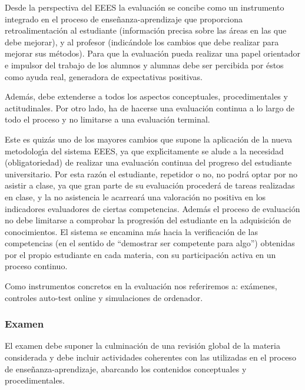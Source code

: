 Desde la perspectiva del EEES la evaluaci\'{o}n se concibe como un 
{  instrumento integrado} en el proceso de  ense\~{n}anza-aprendizaje
que {  proporciona  retroalimentaci\'{o}n} al estudiante
(informaci\'{o}n precisa sobre las \'{a}reas en las que debe mejorar),
y al profesor (indic\'{a}ndole los cambios que debe realizar 
para mejorar sus m\'{e}todos).
Para que la evaluaci\'{o}n pueda realizar una papel orientador e impulsor
del trabajo de los alumnos  y alumnas debe ser percibida por \'{e}stos como ayuda real,
generadora de {  expectativas positivas}.

Adem\'{a}s, debe extenderse a todos los aspectos {conceptuales},
{procedimentales} y {actitudinales}. Por otro lado, 
ha de  hacerse una evaluaci\'{o}n continua
 a lo largo de {  todo el proceso} y no limitarse a una
evaluaci\'{o}n terminal.



Este es quiz\'{a}s uno de los mayores cambios  que  supone la 
aplicaci\'{o}n de la nueva metodolog\'{\i}a del sistema EEES,
 ya que expl\'{\i}citamente se
alude a la necesidad (obligatoriedad)
 de realizar una {evaluaci\'{o}n continua} del
progreso del estudiante universitario.
Por esta raz\'{o}n el estudiante, repetidor o no,  no podr\'{a} optar
por no asistir a clase, ya que gran parte de su evaluaci\'{o}n proceder\'{a}
de tareas realizadas en clase, y la no asistencia
le acarrear\'{a} una valoraci\'{o}n no positiva en los indicadores 
evaluadores de ciertas competencias.
 Adem\'{a}s el proceso de evaluaci\'{o}n
no debe limitarse a comprobar la progresi\'{o}n del estudiante en la 
adquisici\'{o}n de conocimientos. El  sistema
se encamina m\'{a}s hacia la verificaci\'{o}n de las competencias
(en el sentido de ``demostrar ser competente para algo'')
obtenidas por el propio estudiante en cada materia, con su participaci\'{o}n
activa en un proceso continuo.

Como instrumentos concretos en la evaluaci\'{o}n nos referiremos
a: ex\'{a}menes, controles   auto-test online y simulaciones de ordenador.


\subsubsection{Examen}

El {  examen} debe suponer la culminaci\'{o}n de una {  revisi\'{o}n
global} de la materia considerada y debe incluir {  actividades coherentes}
con las utilizadas en el proceso de ense\~{n}anza-aprendizaje,
abarcando los contenidos conceptuales y procedimentales.


